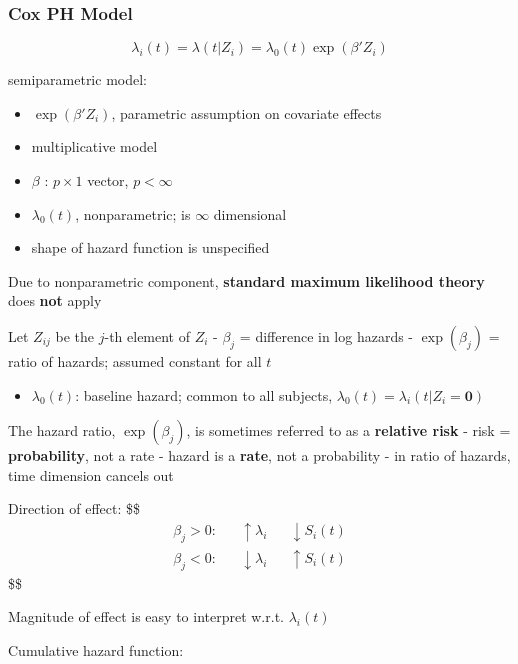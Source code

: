 \documentclass[
]{book}
\providecommand{\tightlist}{%
  \setlength{\itemsep}{0pt}\setlength{\parskip}{0pt}}
\begin{document}
{{{\hypertarget{cox-ph-model}{%
\subsubsection{Cox PH Model}\label{cox-ph-model}}

\[
\lambda_i (t) = \lambda (t \vert Z_i ) = \lambda_0 (t) \exp (\beta' Z_i) \tag{Cox Model}
\]

semiparametric model:

\begin{itemize}
\tightlist
\item
  \(\exp(\beta ' Z_i)\), parametric assumption on covariate effects
\item
  multiplicative model
\item
  \(\beta\) : \(p \times 1\) vector, \(p < \infty\)
\item
  \(\lambda_0(t)\), nonparametric; is \(\infty\) dimensional
\item
  shape of hazard function is unspecified
\end{itemize}

Due to nonparametric component, \textbf{standard maximum likelihood theory} does \textbf{not} apply

Let \(Z_{ij}\) be the \(j\)-th element of \(Z_i\)
- \(\beta_j\) = difference in log hazards
- \(\exp(\beta_j)\) = ratio of hazards; assumed constant for all \(t\)

\begin{itemize}
\tightlist
\item
  \(\lambda_0(t)\): baseline hazard; common to all subjects, \(\lambda_0(t) = \lambda_i(t \big | Z_i = \mathbf 0)\)
\end{itemize}

The hazard ratio, \(\exp(\beta_j)\), is sometimes referred to as a \textbf{relative risk}
- risk = \textbf{probability}, not a rate
- hazard is a \textbf{rate}, not a probability
- in ratio of hazards, time dimension cancels out

Direction of effect:
\$\$
\begin{align}

\beta_j > 0: &&\uparrow\lambda_i &&\downarrow S_i(t)
\\
\beta_j < 0: &&\downarrow\lambda_i &&\uparrow S_i(t)


\end{align}
\$\$

Magnitude of effect is easy to interpret w.r.t. \(\lambda_i(t)\)

Cumulative hazard function:

}}}
\end{document}
